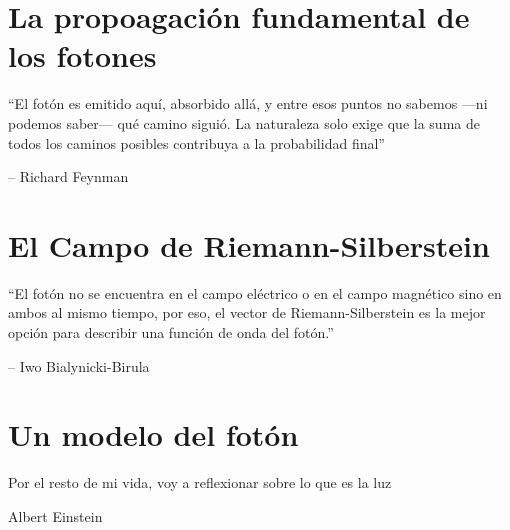 \documentclass[spanish,11pt,twoside,openright]{book}
\begin{document}
	

    \chapter{La propoagación fundamental de los fotones}
	\thispagestyle{empty}
	\vspace*{2cm}
	\begin{center}
		{\itshape\Huge \par}
		\vspace{1cm}
		\epigraph{``El fotón es emitido aquí, absorbido allá, y entre esos puntos no sabemos —ni podemos saber— qué camino siguió. La naturaleza solo exige que la suma de todos los caminos posibles contribuya a la probabilidad final''}{-- Richard Feynman }
	\end{center}
	\clearpage

	


        \chapter{El Campo de Riemann-Silberstein}
	\thispagestyle{empty}
	\vspace*{2cm}
	\begin{center}
		{\itshape\Huge \par}
		\vspace{1cm}
		\epigraph{``El fotón no se encuentra en el campo eléctrico o en el campo magnético sino en ambos al mismo tiempo, por eso, el vector de Riemann-Silberstein es la mejor opción para describir una función de onda del fotón.''}{-- Iwo Bialynicki-Birula }
	\end{center}
	\clearpage

	

    \chapter{Un modelo del fotón}
    	\thispagestyle{empty}
    	\vspace*{2cm}
    	\begin{center}
    		{\itshape\Huge \par}
    		\vspace{1cm}
    		\epigraph{Por el resto de mi vida, voy a reflexionar sobre lo que es la luz}{Albert Einstein}
    	\end{center}
    	\clearpage

    	
	
	
	
\end{document}
